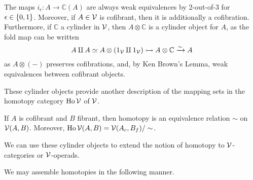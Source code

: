 \documentclass[a4paper,10pt
,draft
]{article}%
\renewcommand{\1}{\eta}%
\begin{document}
\begin{remark}
      \label{CYL_REM}
      The maps $i_\epsilon: A \to \mathbb C(A)$ are always weak equivalences by 2-out-of-3 for $\epsilon \in \left\{0,1\right\}$.
      Moreover, if $A \in \mathcal V$ is cofibrant, then it is additionally a cofibration.
      Furthermore, if $\mathbb C$ a cylinder in $\mathcal V$,
      then $A \otimes \mathbb C$ is a cylinder object for $A$,
      as the fold map can be written
      \begin{equation}
            A \amalg A \simeq A \otimes (1_{\mathcal V} \amalg 1_{\mathcal V}) \rightarrowtail A \otimes \mathbb C \xrightarrow{\sim} A
      \end{equation}
      as $A \otimes (-)$ preserves cofibrations, and, by Ken Brown's Lemma, weak equivalences between cofibrant objects.
\end{remark}

These cylinder objects provide another description of the mapping sets in the homotopy category $\operatorname{Ho} \mathcal V$ of $\mathcal V$.

\begin{proposition}
      If $A$ is cofibrant and $B$ fibrant, then
      homotopy is an equivalence relation $\sim$ on $\mathcal V(A,B)$.
      Moreover, 
      $\operatorname{Ho} \mathcal V (A,B) = \mathcal V(A_c, B_f)/\sim$.
\end{proposition}

We can use these cylinder objects to extend the notion of homotopy to $\mathcal V$-categories or $\mathcal V$-operads.







We may assemble homotopies in the following manner.
\end{document}
